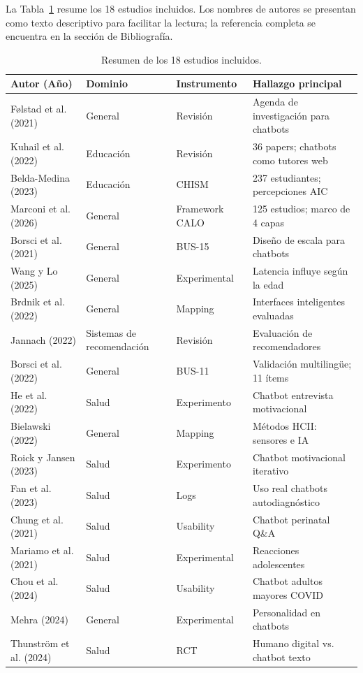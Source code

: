 \documentclass[11pt,twocolumn]{article}
\begin{document}
La Tabla~\ref{tab:estudios} resume los 18 estudios incluidos. Los nombres de autores se presentan como texto descriptivo para facilitar la lectura; la referencia completa se encuentra en la sección de Bibliografía.

\begin{table}[t]
\centering
\caption{Resumen de los 18 estudios incluidos.}
\label{tab:estudios}
\begin{tabular}{@{}p{3cm}p{2cm}p{2cm}p{6.5cm}@{}}
\toprule
\textbf{Autor (Año)} & \textbf{Dominio} & \textbf{Instrumento} & \textbf{Hallazgo principal} \\
\midrule
Følstad et al. (2021) & General & Revisión & Agenda de investigación para chatbots \\
Kuhail et al. (2022) & Educación & Revisión & 36 papers; chatbots como tutores web \\
Belda-Medina (2023) & Educación & CHISM & 237 estudiantes; percepciones AIC \\
Marconi et al. (2026) & General & Framework CALO & 125 estudios; marco de 4 capas \\
Borsci et al. (2021) & General & BUS-15 & Diseño de escala para chatbots \\
Wang y Lo (2025) & General & Experimental & Latencia influye según la edad \\
Brdnik et al. (2022) & General & Mapping & Interfaces inteligentes evaluadas \\
Jannach (2022) & Sistemas de recomendación & Revisión & Evaluación de recomendadores \\
Borsci et al. (2022) & General & BUS-11 & Validación multilingüe; 11 ítems \\
He et al. (2022) & Salud & Experimento & Chatbot entrevista motivacional \\
Bielawski (2022) & General & Mapping & Métodos HCII: sensores e IA \\
Roick y Jansen (2023) & Salud & Experimento & Chatbot motivacional iterativo \\
Fan et al. (2023) & Salud & Logs & Uso real chatbots autodiagnóstico \\
Chung et al. (2021) & Salud & Usability & Chatbot perinatal Q\&A \\
Mariamo et al. (2021) & Salud & Experimental & Reacciones adolescentes \\
Chou et al. (2024) & Salud & Usability & Chatbot adultos mayores COVID \\
Mehra (2024) & General & Experimental & Personalidad en chatbots \\
Thunström et al. (2024) & Salud & RCT & Humano digital vs. chatbot texto \\
\bottomrule
\end{tabular}
\end{table}
\end{document}
